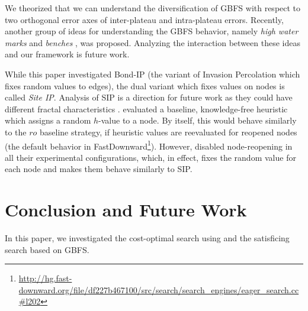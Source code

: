We theorized that we can understand the diversification of GBFS with
respect to two orthogonal error axes of inter-plateau and intra-plateau
errors. Recently, another group of ideas for understanding the GBFS behavior,
namely \emph{high water marks} \cite{wilt2014speedy} and \emph{benches} \cite{heusner2017understanding}, was proposed.
Analyzing the interaction between these ideas and our framework is future work.

While this paper investigated Bond-IP (the variant of Invasion Percolation which fixes random values to edges),
the dual variant which fixes values on nodes is called \emph{Site IP}.
Analysis of SIP is a direction for future work as they could have different fractal characteristics \cite{sheppard1999invasion}.
\citeauthor{valenzano2014comparison} \citeyear[Section 4.3]{valenzano2014comparison} evaluated a baseline, knowledge-free heuristic which assigns a random $h$-value to a node.
By itself, this would behave similarly to the $ro$ baseline strategy, if heuristic values are reevaluated for reopened nodes (the default behavior in FastDownward\footnote{\url{http://hg.fast-downward.org/file/df227b467100/src/search/search_engines/eager_search.cc\#l202}}).
However, \citeauthor{valenzano2014comparison} disabled node-reopening in all their experimental configurations, which, in effect, fixes the random value for each node and makes them behave similarly to SIP.


\chapter{Conclusion and Future Work}

In this paper, we investigated the cost-optimal search using \astar and the satisficing search based on GBFS.


\begin{comment} %
We sought to
(1) shed some light on the importance of tie-breaking in \astar,  %
(2) improve \astar without modifying its main heuristic function at all, and (3) to
improve \astar by introducing inadmissible techniques. We reached all of these goals successfully: We sought
various possible enhancements and achieved significant performance improvements solely by the tie-breaking
techniques. In detail, the contributions in this paper are the following:
\end{comment}

